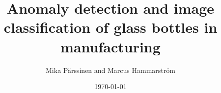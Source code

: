 \documentclass[a4paper]{article}
\title{Anomaly detection and image classification of glass bottles in manufacturing}
\author{Mika Pärssinen and Marcus Hammarström}
\date{\today}
\begin{document}
\maketitle










\renewcommand{\refname}{References}


\end{document}
